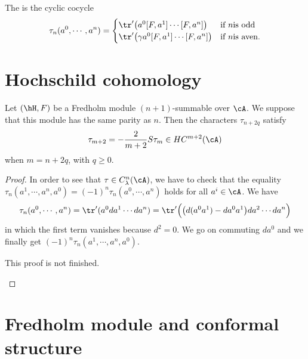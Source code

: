 The  is the cyclic cocycle
\begin{equation}
\tau_n(a^0,\cdots,a^{n})=
\begin{cases}
    \tr'\big( a^0[F,a^1]\cdots[F,a^{n}] \big)&\text{if }n \text{is odd}\\
    \tr'\big( \gamma a^0[F,a^1]\cdots[F,a^{n}] \big)&\text{if }n \text{is aven}.
\end{cases}
\end{equation}

\section{Hochschild cohomology}

\begin{proposition}
Let $(\hH,F)$ be a Fredholm module $(n+1)$-summable over $\cA$. We suppose that this module has the same parity as $n$. Then the characters $\tau_{n+2q}$ satisfy
\begin{equation}
\tau_{m+2}=-\frac{ 2 }{ m+2 }S\tau_m\in HC^{m+2}(\cA)
\end{equation}
when $m=n+2q$, with $q\geq 0$.
\end{proposition}

\begin{proof}
In order to see that $\tau\in C^n_{\lambda}(\cA)$, we have to check that the equality $\tau_n(a^1,\cdots,a^{n},a^0)=(-1)^n\tau_n(a^0,\cdots,a^{n})$ holds for all $a^i\in\cA$. We have
\[ 
\tau_n(a^0,\cdots,a^{n})=\tr'(a^0da^1\cdots da^{n})=\tr'\Big( \big( d(a^0a^1)-da^0a^1 \big)da^2\cdots da^{n} \Big)
\]
in which the first term vanishes because $d^2=0$. We go on commuting $da^0$ and we finally get $(-1)^n\tau_n(a^1,\cdots,a^n,a^0)$.

\begin{probleme}
	This proof is not finished.
\end{probleme}

\end{proof}
\section{Fredholm module and conformal structure}

